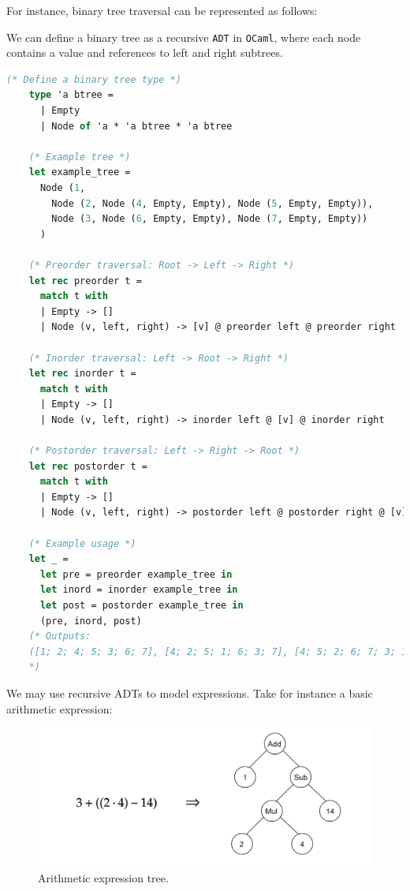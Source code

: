 \newpage 

\noindent
For instance, binary tree traversal can be represented as follows:

\begin{Example}
    We can define a binary tree as a recursive \texttt{ADT} in \texttt{OCaml}, where each node contains a value and references to left and right subtrees.

    \begin{lstlisting}[language=OCaml, caption={Binary Tree Definition and Traversals}, numbers=none]
    (* Define a binary tree type *)
    type 'a btree =
      | Empty
      | Node of 'a * 'a btree * 'a btree

    (* Example tree *)
    let example_tree =
      Node (1,
        Node (2, Node (4, Empty, Empty), Node (5, Empty, Empty)),
        Node (3, Node (6, Empty, Empty), Node (7, Empty, Empty))
      )

    (* Preorder traversal: Root -> Left -> Right *)
    let rec preorder t =
      match t with
      | Empty -> []
      | Node (v, left, right) -> [v] @ preorder left @ preorder right

    (* Inorder traversal: Left -> Root -> Right *)
    let rec inorder t =
      match t with
      | Empty -> []
      | Node (v, left, right) -> inorder left @ [v] @ inorder right

    (* Postorder traversal: Left -> Right -> Root *)
    let rec postorder t =
      match t with
      | Empty -> []
      | Node (v, left, right) -> postorder left @ postorder right @ [v]

    (* Example usage *)
    let _ =
      let pre = preorder example_tree in
      let inord = inorder example_tree in
      let post = postorder example_tree in
      (pre, inord, post) 
    (* Outputs: 
    ([1; 2; 4; 5; 3; 6; 7], [4; 2; 5; 1; 6; 3; 7], [4; 5; 2; 6; 7; 3; 1])
    *)
    \end{lstlisting}
\end{Example}

\newpage 

\noindent
We may use recursive ADTs to model expressions. Take for instance a basic arithmetic expression:
\begin{figure}[h]
    \centering
    \includegraphics[width=1\textwidth]{Sections/adt/expr.png}
    \caption{Arithmetic expression tree.}
\end{figure}


